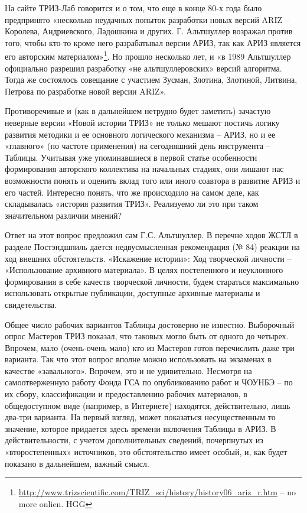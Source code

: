 \documentclass[11pt,a4paper]{article}
\begin{document}
На сайте ТРИЗ-Лаб говорится и о том, что еще в конце 80-х года было
предпринято «несколько неудачных попыток разработки новых версий ARIZ --
Королева, Андриевского, Ладошкина и других. Г. Альтшуллер возражал против
того, чтобы кто-то кроме него разрабатывал версии АРИЗ, так как АРИЗ является
его авторским
материалом»\footnote{\url{http://www.trizscientific.com/TRIZ_sci/history/history06_ariz_r.htm}
  -- no more onlien. HGG}.  Но прошло несколько лет, и «в 1989 Альтшуллер
официально разрешил разработку «не альтшуллеровских» версий алгоритма. Тогда
же состоялось совещание с участием Зусман, Злотина, Злотиной, Литвина, Петрова
по разработке новой версии ARIZ».

Противоречивые и (как в дальнейшем нетрудно будет заметить) зачастую неверные
версии «Новой истории ТРИЗ» не только мешают постичь логику развития методики
и ее основного логического механизма -- АРИЗ, но и ее «главного» (по частоте
применения) на сегодняшний день инструмента -- Таблицы. Учитывая уже
упоминавшиеся в первой статье особенности формирования авторского коллектива
на начальных стадиях, они лишают нас возможности понять и оценить вклад того
или иного соавтора в развитие АРИЗ и его частей. Интересно понять, что же
происходило на самом деле, как складывалась «история развития ТРИЗ».
Реализуемо ли это при таком значительном различии мнений?

Ответ на этот вопрос предложил сам Г.С. Альтшуллер. В перечне ходов ЖСТЛ
\cite{Altshuller1994} в разделе Постэндшпиль дается недвусмысленная
рекомендация (№ 84) реакции на ход внешних обстоятельств. «Искажение истории»:
Ход творческой личности -- «Использование архивного материала». В целях
постепенного и неуклонного формирования в себе качеств творческой личности,
будем стараться максимально использовать открытые публикации, доступные
архивные материалы и свидетельства.

Общее число рабочих вариантов Таблицы достоверно не известно. Выборочный опрос
Мастеров ТРИЗ показал, что таковых могло быть от одного до четырех. Впрочем,
мало (очень-очень мало) кто из Мастеров готов перечислить даже три варианта.
Так что этот вопрос вполне можно использовать на экзаменах в качестве
«завального». Впрочем, это и не удивительно. Несмотря на самоотверженную
работу Фонда ГСА по опубликованию работ и ЧОУНБЭ -- по их сбору, классификации
и предоставлению рабочих материалов, в общедоступном виде (например, в
Интернете) находятся, действительно, лишь два-три варианта. На первый взгляд,
может показаться несущественным то значение, которое придается здесь времени
включения Таблицы в АРИЗ. В действительности, с учетом дополнительных
сведений, почерпнутых из «второстепенных» источников, это обстоятельство имеет
особый, и, как будет показано в дальнейшем, важный смысл.
\end{document}
